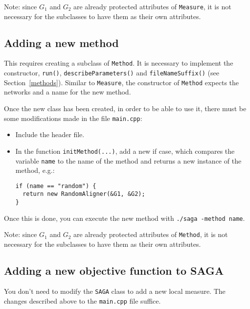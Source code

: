 \documentclass[]{article}
\begin{document}
Note: since $G_1$ and $G_2$ are already protected attributes of \texttt{Measure}, it is not necessary for the subclasses to have them as their own attributes.

\subsection{Adding a new method}
This requires creating a subclass of \texttt{Method}. It is necessary to implement the constructor, \texttt{run()}, \texttt{describeParameters()} and \texttt{fileNameSuffix()} (see Section~\ref{methods}). Similar to \texttt{Measure}, the constructor of \texttt{Method} expects the networks and a name for the new method.

Once the new class has been created, in order to be able to use it, there must be some modifications made in the file \texttt{main.cpp}:
\begin{itemize}
\item Include the header file.
\item In the function \texttt{initMethod(...)}, add a new if case, which compares the variable \texttt{name} to the name of the method and returns a new instance of the method, e.g.:
\begin{verbatim}
if (name == "random") {
  return new RandomAligner(&G1, &G2);
}
\end{verbatim}
\end{itemize}
Once this is done, you can execute the new method with \texttt{./saga -method name}.

Note: since $G_1$ and $G_2$ are already protected attributes of \texttt{Method}, it is not necessary for the subclasses to have them as their own attributes.

\subsection{Adding a new objective function to SAGA}

You don't need to modify the \texttt{SAGA} class to add a new local measure. The changes described above to the \texttt{main.cpp} file suffice.
\end{document}
